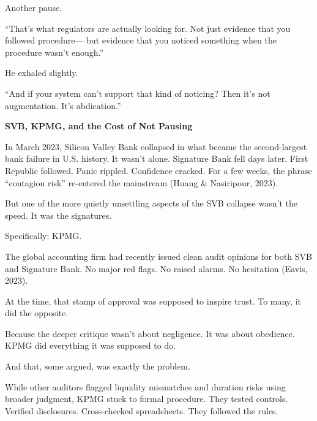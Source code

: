 Another pause.

“That’s what regulators are actually looking for.
Not just evidence that you followed procedure—
but evidence that you noticed something when the procedure wasn’t enough.”

He exhaled slightly.

“And if your system can’t support that kind of noticing?
Then it’s not augmentation.
It’s abdication.”

\medskip

\begin{HistoricalSidebar}{\textbf{SVB, KPMG, and the Cost of Not Pausing}}

  In March 2023, Silicon Valley Bank collapsed in what became the second-largest bank failure in U.S. history. 
  It wasn’t alone. Signature Bank fell days later. First Republic followed. Panic rippled. 
  Confidence cracked. For a few weeks, the phrase ``contagion risk'' re-entered the mainstream 
  (Huang \& Nasiripour, 2023).

  \medskip
  
  But one of the more quietly unsettling aspects of the SVB collapse wasn’t the speed.
  It was the signatures.

  \medskip
  
  
  Specifically: KPMG.

  \medskip
  
  
  The global accounting firm had recently issued clean audit opinions for both SVB and Signature Bank. 
  No major red flags. No raised alarms. No hesitation (Eavis, 2023).

  \medskip
  
  
  At the time, that stamp of approval was supposed to inspire trust.
  To many, it did the opposite.

  \medskip
  
  
  Because the deeper critique wasn’t about negligence. It was about obedience.
  KPMG did everything it was supposed to do.

  \medskip
  
  
  And that, some argued, was exactly the problem.

  \medskip
  
  
  While other auditors flagged liquidity mismatches and duration risks using broader judgment, 
  KPMG stuck to formal procedure. They tested controls. Verified disclosures. Cross-checked spreadsheets. 
  They followed the rules.

  \medskip
  

\end{HistoricalSidebar}
